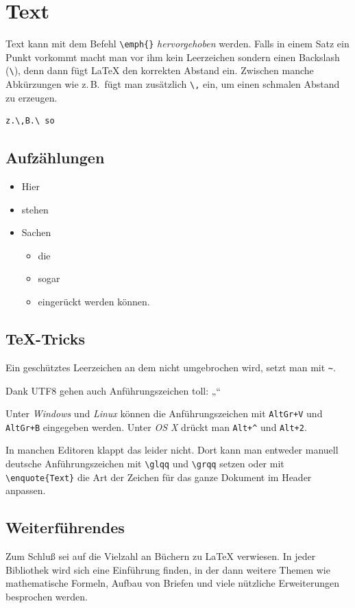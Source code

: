 \section{Text}

Text kann mit dem Befehl \verb|\emph{}| \emph{hervorgehoben} werden. Falls in einem Satz ein Punkt vorkommt macht man vor ihm kein Leerzeichen sondern einen Backslash (\verb|\|), denn dann fügt \LaTeX{} den korrekten Abstand ein. Zwischen manche Abkürzungen wie z.\,B.\ fügt man zusätzlich \verb|\,| ein, um einen schmalen Abstand zu erzeugen.

\begin{verbatim}
z.\,B.\ so
\end{verbatim}


\subsection{Aufzählungen}

\begin{itemize}
    \item  Hier
    \item  stehen
    \item  Sachen
    \begin{itemize}
        \item  die
        \item  sogar
        \item  eingerückt werden können.
    \end{itemize}
\end{itemize}


\subsection{TeX-Tricks}

Ein geschütztes Leerzeichen an dem nicht umgebrochen wird, setzt man mit \verb!~!.

Dank UTF8 gehen auch Anführungszeichen toll: „“

Unter \emph{Windows} und \emph{Linux} können die Anführungszeichen mit \texttt{AltGr+V} und \texttt{AltGr+B} eingegeben werden. Unter \emph{OS X} drückt man \texttt{Alt+\^{}} und \texttt{Alt+2}.

In manchen Editoren klappt das leider nicht. Dort kann man entweder manuell deutsche Anführungszeichen mit \verb!\glqq! und \verb!\grqq! setzen oder mit \verb!\enquote{Text}! die Art der Zeichen für das ganze Dokument im Header anpassen.


\subsection{Weiterführendes}

Zum Schluß sei auf die Vielzahl an Büchern zu \LaTeX{} verwiesen. In jeder Bibliothek wird sich eine Einführung finden, in der dann weitere Themen wie mathematische Formeln, Aufbau von Briefen und viele nützliche Erweiterungen besprochen werden.

